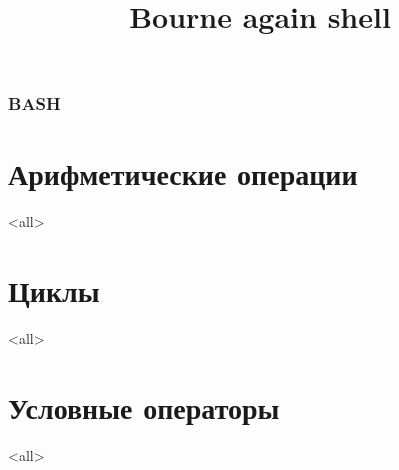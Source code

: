 
\title[bash]{Bourne again shell}




\begin{frame}
	\frametitle{BASH}
	\titlepage
	\vspace{-0.5cm}
	\begin{center}
	\end{center}
\end{frame}

\begin{frame}
	\tableofcontents
\end{frame}




\section{Арифметические операции}

\mode<all>{}

\section{Циклы}

\mode<all>{}

\section{Условные операторы}

\mode<all>{}




